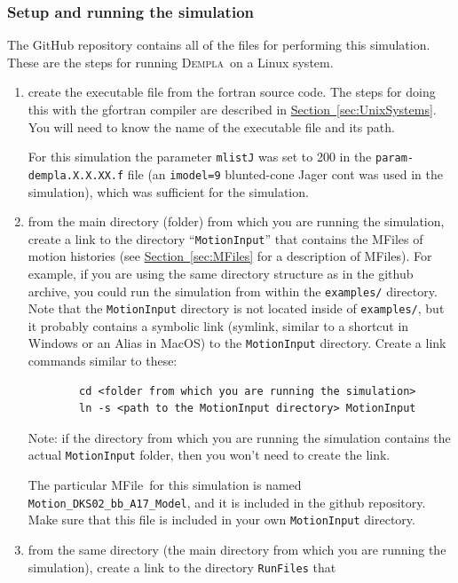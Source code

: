 \documentclass[letterpaper,11pt]{article}
\newcommand{\Dempla}{\textsc{Dempla}}
\newcommand{\MFile}{\textsf{MFile}}
\begin{document}
\subsubsection{Setup and running the simulation}\label{sec:setupwave}
The GitHub repository contains all of the files for
performing this simulation.
These are the steps for running \Dempla\ on a Linux system.
%
\begin{enumerate}
	\item
	create the executable file from the fortran source code.
	The steps for doing this with the \textsf{gfortran}
	compiler are described in
	\hyperref[sec:UnixSystems]{Section~\ref*{sec:UnixSystems}}.
	You will need to know the name of the executable
	file and its path.
	\par
	For this simulation the parameter \texttt{mlistJ} was
	set to 200 in the \texttt{param-dempla.X.X.XX.f} file
	(an \texttt{imodel=9} blunted-cone Jager cont
	was used in the simulation),
	which was sufficient for the simulation.
	\item
	from the main directory (folder) from which you are running the
	simulation, create a link to the directory
	``\texttt{MotionInput}'' that contains
	the \MFile s of motion histories
	(see \hyperref[sec:MFiles]{Section~\ref*{sec:MFiles}}
	for a description of \MFile s).
	For example, if you are using the
	same directory structure as in the github archive, you could run
	the simulation from within the \texttt{examples/} directory.
	Note that
	the \texttt{MotionInput}
	directory is not located inside of \texttt{examples/}, but it
	probably contains a symbolic link
	(symlink, similar to a shortcut in Windows or an Alias in MacOS)
	to the \texttt{MotionInput} 
	directory.
	Create a link commands similar to these:
	\begin{verbatim}
		cd <folder from which you are running the simulation>
		ln -s <path to the MotionInput directory> MotionInput
	\end{verbatim}
	Note: if the directory
	from which you are running the simulation contains
	the actual \texttt{MotionInput} folder,
	then you won't need to create the link.
	\par
	The particular \MFile\ for this simulation is named
	\texttt{Motion\_DKS02\_bb\_A17\_Model},
	and it is included in the github repository.
	Make sure that this file is included in your own
	\texttt{MotionInput} directory.
	\item
	from the same directory (the main directory from which you are running 
	the simulation), create a link to the directory \texttt{RunFiles} that

\end{enumerate}
\end{document}
